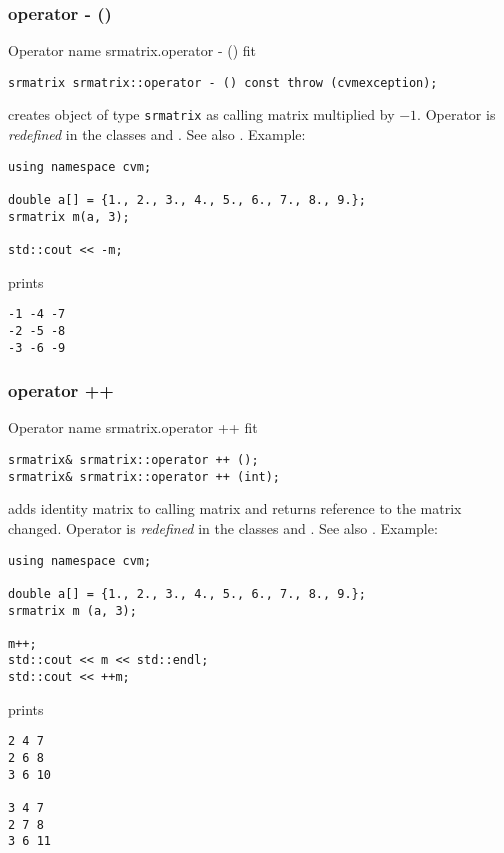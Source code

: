 \subsubsection{operator - ()}
Operator%
\pdfdest name {srmatrix.operator - ()} fit
\begin{verbatim}
srmatrix srmatrix::operator - () const throw (cvmexception);
\end{verbatim}
creates  object of type \verb"srmatrix" as
 calling matrix multiplied by $-1$.
Operator is \emph{redefined} in the classes
and .
See also .
Example:
\begin{Verbatim}
using namespace cvm;

double a[] = {1., 2., 3., 4., 5., 6., 7., 8., 9.};
srmatrix m(a, 3);

std::cout << -m;
\end{Verbatim}
prints
\begin{Verbatim}
-1 -4 -7
-2 -5 -8
-3 -6 -9
\end{Verbatim}
\newpage



\subsubsection{operator ++}
Operator%
\pdfdest name {srmatrix.operator ++} fit
\begin{verbatim}
srmatrix& srmatrix::operator ++ ();
srmatrix& srmatrix::operator ++ (int);
\end{verbatim}
adds identity matrix to  calling matrix
and returns  reference to
the matrix changed.
Operator is \emph{redefined} in the classes
 and .
See also .
Example:
\begin{Verbatim}
using namespace cvm;

double a[] = {1., 2., 3., 4., 5., 6., 7., 8., 9.};
srmatrix m (a, 3);

m++;
std::cout << m << std::endl;
std::cout << ++m;
\end{Verbatim}
prints
\begin{Verbatim}
2 4 7
2 6 8
3 6 10

3 4 7
2 7 8
3 6 11
\end{Verbatim}
\newpage



